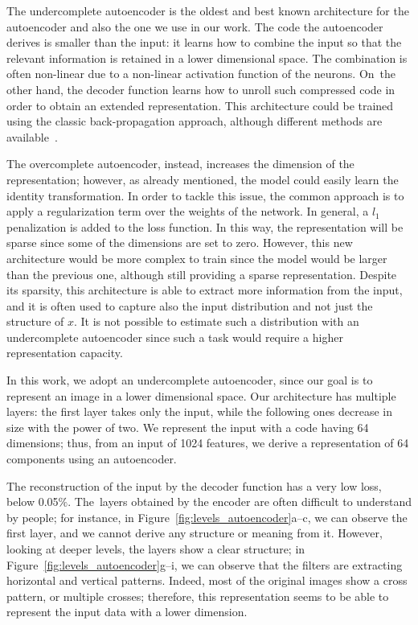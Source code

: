 The undercomplete autoencoder is the oldest and best known architecture for the autoencoder and also the one we use in our work. The code the autoencoder derives is smaller than the input: it learns how to combine the input so that the relevant information is retained in a lower dimensional space. The combination is often non-linear due to a non-linear activation function of the neurons. On~the other hand, the decoder function learns how to unroll such compressed code in order to obtain an extended representation. This architecture could be trained using the classic back-propagation approach, although different methods are available~\cite{goodfellow_deep_2016}.

The overcomplete autoencoder, instead, increases the dimension of the representation; however, as already mentioned, the model could easily learn the identity transformation. In order to tackle this issue, the common approach is to apply a regularization term over the weights of the network. In general, a $l_1$ penalization is added to the loss function.
In this way, the representation will be sparse since some of the dimensions are set to zero.
However, this new architecture would be more complex to train since the model would be larger than the previous one, although still providing a sparse representation.
Despite its sparsity, this architecture is able to extract more information from the input, and it is often used to capture also the input distribution and not just the structure of $x$. It is not possible to estimate such a distribution with an undercomplete autoencoder since such a task would require a higher representation capacity.

In this work, we adopt an undercomplete autoencoder, since our goal is to represent an image in a lower dimensional space. 
Our architecture has multiple layers: the first layer takes only the input, while the following ones decrease in size with the power of two.
We represent the input with a code having 64 dimensions; thus, from an input of 1024 features, we derive a representation of 64 components using an autoencoder.

The reconstruction of the input by the decoder function has a very low loss, below 0.05$\%$. The~layers obtained by the encoder are often difficult to understand by people; for instance, in Figure~\ref{fig:levels_autoencoder}a--c, we can observe the first layer, and we cannot derive any structure or meaning from it.
However, looking at deeper levels, the layers show a clear structure; in Figure~\ref{fig:levels_autoencoder}g--i, we can observe that the filters are extracting horizontal and vertical patterns. Indeed, most of the original images show a cross pattern, or multiple crosses; therefore, this representation seems to be able to represent the input data with a lower dimension.

